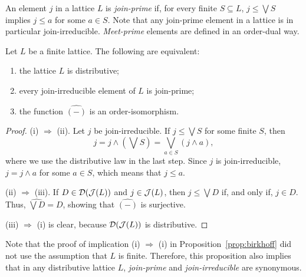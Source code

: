 An element $j$ in a lattice $L$ is \emph{join-prime} if, for every finite $S \subseteq L$, $j \leq \bigvee S$ implies $j \leq a$ for some $a \in S$. Note that any join-prime element in a lattice is in particular join-irreducible. \emph{Meet-prime} elements are defined in an order-dual way.
\begin{proposition}\label{prop:birkhoff}
Let $L$ be a finite lattice. The following are equivalent:
\begin{enumerate}
\item[(i)] the lattice $L$ is distributive;
\item[(ii)] every join-irreducible element of $L$ is join-prime;
\item[(iii)] the function $\widehat{(-)}$ is an order-isomorphism.
\end{enumerate}
\end{proposition}
\begin{proof}
(i) $\Rightarrow$ (ii). Let $j$ be join-irreducible. If $j \leq \bigvee S$ for some finite $S$, then
\[ j = j \wedge \left( \bigvee S \right) = \bigvee_{a \in S} (j \wedge a),\]
where we use the distributive law in the last step. Since $j$ is join-irreducible, $j = j \wedge a$ for some $a \in S$, which means that $j \leq a$.

(ii) $\Rightarrow$ (iii). If $D \in \mathcal{D}(\mathcal{J}(L))$ and $j \in \mathcal{J}(L)$, then $j \leq \bigvee D$ if, and only if, $j \in D$. Thus, $\widehat{\bigvee D} = D$, showing that $\widehat{(-)}$ is surjective.

(iii) $\Rightarrow$ (i) is clear, because $\mathcal{D}(\mathcal{J}(L))$ is distributive.
\end{proof}
Note that the proof of implication (i) $\Rightarrow$ (i) in Proposition~\ref{prop:birkhoff} did not use the assumption that $L$ is finite. Therefore, this proposition also implies that in any distributive lattice $L$, \emph{join-prime} and \emph{join-irreducible} are synonymous.



